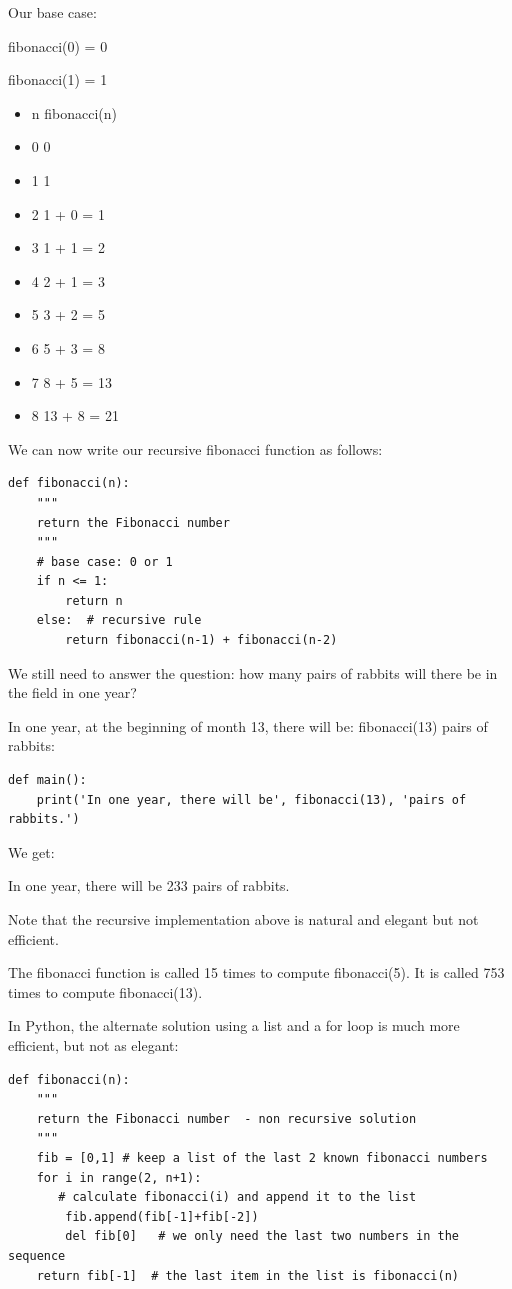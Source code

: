 \documentclass{article}
\begin{document}
Our base case:

fibonacci(0)  = 0 

fibonacci(1)  =  1

\begin{itemize}
\item n	fibonacci(n)
\item 0	0
\item 1	1
\item 2	1 + 0 = 1
\item 3	1 + 1 = 2
\item 4	2 + 1 = 3
\item 5	3 + 2 = 5
\item 6	5 + 3 = 8
\item 7	8 + 5 = 13
\item 8	13 + 8 = 21
\end{itemize}

We can now write our recursive fibonacci function as follows:

\begin{lstlisting}
def fibonacci(n):
    """
    return the Fibonacci number 
    """
    # base case: 0 or 1
    if n <= 1:
        return n
    else:  # recursive rule
        return fibonacci(n-1) + fibonacci(n-2)
\end{lstlisting}
        
We still need to answer the question: how many pairs of rabbits will there be in the field in one year?

In one year, at the beginning of month 13, there will be: fibonacci(13) pairs of rabbits:

\begin{lstlisting}
def main():
    print('In one year, there will be', fibonacci(13), 'pairs of rabbits.')
\end{lstlisting}
    
We get:

In one year, there will be 233 pairs of rabbits.

Note that the recursive implementation above is natural and elegant but not efficient.

The fibonacci function is called 15 times to compute fibonacci(5).  It is called 753 times to compute fibonacci(13).

In Python, the alternate solution using a list and a for loop is much more efficient, but not as elegant:

\begin{lstlisting}
def fibonacci(n):
    """
    return the Fibonacci number  - non recursive solution
    """
    fib = [0,1] # keep a list of the last 2 known fibonacci numbers
    for i in range(2, n+1):
       # calculate fibonacci(i) and append it to the list
        fib.append(fib[-1]+fib[-2]) 
        del fib[0]   # we only need the last two numbers in the sequence
    return fib[-1]  # the last item in the list is fibonacci(n)
\end{lstlisting}
\end{document}
